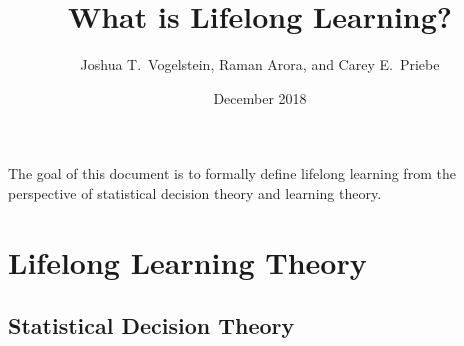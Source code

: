 \documentclass{article}
\title{What is Lifelong Learning?}
\author{Joshua T.~Vogelstein, Raman Arora, and Carey E.~Priebe}
\affil{Johns Hopkins University}
\date{December 2018}
\begin{document}
\maketitle

The goal of this document is to formally define lifelong learning from the perspective of statistical decision theory and learning theory.    

\setcounter{tocdepth}{1}
\tableofcontents

\clearpage
\setcounter{section}{-1}
\section{Lifelong Learning Theory}
\subsection{Statistical Decision Theory}
\end{document}

